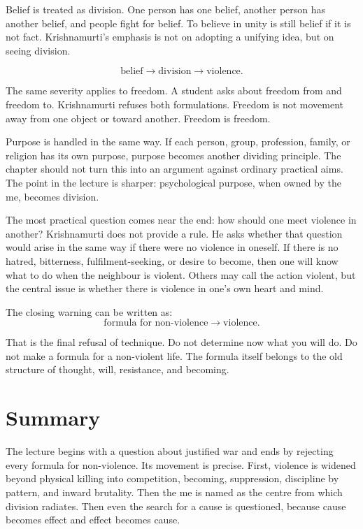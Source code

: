 Belief is treated as division. One person has one belief, another person has another belief, and people fight for belief. To believe in unity is still belief if it is not fact. Krishnamurti's emphasis is not on adopting a unifying idea, but on seeing division.

\begin{equation}
\text{belief}
\rightarrow
\text{division}
\rightarrow
\text{violence}.
\end{equation}

The same severity applies to freedom. A student asks about freedom from and freedom to. Krishnamurti refuses both formulations. Freedom is not movement away from one object or toward another. Freedom is freedom.

Purpose is handled in the same way. If each person, group, profession, family, or religion has its own purpose, purpose becomes another dividing principle. The chapter should not turn this into an argument against ordinary practical aims. The point in the lecture is sharper: psychological purpose, when owned by the me, becomes division.

The most practical question comes near the end: how should one meet violence in another? Krishnamurti does not provide a rule. He asks whether that question would arise in the same way if there were no violence in oneself. If there is no hatred, bitterness, fulfilment-seeking, or desire to become, then one will know what to do when the neighbour is violent. Others may call the action violent, but the central issue is whether there is violence in one's own heart and mind.

The closing warning can be written as:
\begin{equation}
\text{formula for non-violence}
\rightarrow
\text{violence}.
\end{equation}

That is the final refusal of technique. Do not determine now what you will do. Do not make a formula for a non-violent life. The formula itself belongs to the old structure of thought, will, resistance, and becoming.

\section{Summary}

The lecture begins with a question about justified war and ends by rejecting every formula for non-violence. Its movement is precise. First, violence is widened beyond physical killing into competition, becoming, suppression, discipline by pattern, and inward brutality. Then the me is named as the centre from which division radiates. Then even the search for a cause is questioned, because cause becomes effect and effect becomes cause.

